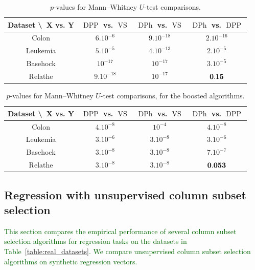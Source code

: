 \documentclass[twoside,11pt]{book}
\newcommand{\rev}[1]{\textcolor{darkgreen}{#1}}
\numberwithin{theorem}{chapter}
\numberwithin{definition}{chapter}
\numberwithin{proposition}{chapter}
\numberwithin{corollary}{chapter}
\numberwithin{example}{chapter}
\numberwithin{lemma}{chapter}
\numberwithin{assumption}{chapter}
\DeclareMathOperator{\DPP}{\mathrm{DPP}}
\DeclareMathOperator{\VS}{\mathrm{VS}}
\DeclareMathOperator{\DPh}{\mathrm{DPh}}
\begin{document}
\begin{table}[h]
\centering
 \begin{tabular}{| c| c | c| c|}
 \hline
  Dataset \textbackslash ~X vs. Y & $\DPP$ vs. $\VS$ & $\DPh$ vs. $\VS$  & $\DPh$ vs. $\DPP$\\
 \hline
 Colon & $6.10^{-6}$ & $9.10^{-18}$  & $2.10^{-16}$\\
 \hline
 Leukemia & $5.10^{-5}$ & $4.10^{-13}$ & $2.10^{-5}$\\
 \hline
 Basehock & $10^{-17}$ &$10^{-17}$ & $3.10^{-5}$ \\
 \hline
 Relathe & $9.10^{-18}$ & $10^{-17}$ & $\bf 0.15$\\
 \hline
\end{tabular}
\caption{$p$-values for Mann–Whitney $U$-test comparisons.
\label{t:tests}}
\end{table}

\begin{table}[h]
\centering
 \begin{tabular}{| c| c | c| c|}
   \hline
    Dataset \textbackslash ~X vs. Y & $\DPP$ vs. $\VS$ & $\DPh$ vs. $\VS$  & $\DPh$ vs. $\DPP$\\
 \hline
 Colon & $4.10^{-8}$ & $10^{-4}$  & $4.10^{-8}$\\
 \hline
 Leukemia & $3.10^{-6}$ & $3.10^{-8}$ & $3.10^{-6}$\\
 \hline
 Basehock & $3.10^{-8}$ &$3.10^{-8}$ & $7.10^{-7}$ \\
 \hline
 Relathe & $3.10^{-8}$ & $3.10^{-8}$ & $\bf 0.053$\\
 \hline
\end{tabular}
\caption{
$p$-values for Mann–Whitney $U$-test comparisons, for the boosted algorithms.
\label{t:tests_boosted}
}
\end{table}

\subsection{Regression with unsupervised column subset selection} \label{sec:num_sim_regression_1}
\rev{
This section compares the empirical performance of several column subset selection algorithms for regression tasks on the datasets in Table~\ref{table:real_datasets}. We compare unsupervised column subset selection algorithms on synthetic regression vectors.}
\end{document}
